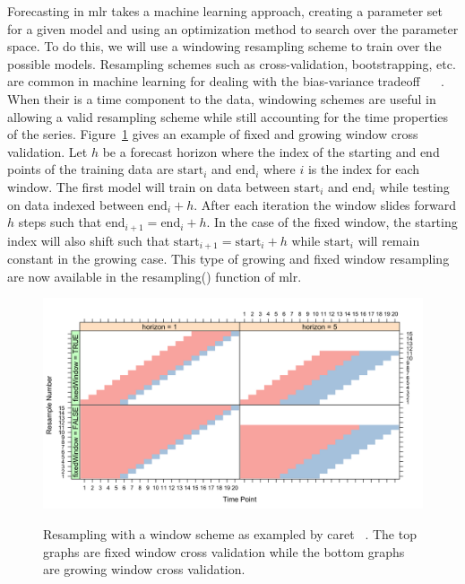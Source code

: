 \documentclass[12pt]{article}\usepackage[]{graphicx}\usepackage[]{color}
\makeatletter
\theoremstyle{definition}
\newcommand\code{\@codex}
\def\@codex#1{{\normalfont\ttfamily\hyphenchar\font=-1 #1}}
\newcommand{\pkg}[1]{{\fontseries{b}\selectfont #1}}
\makeatother
\begin{document}
Forecasting in \pkg{mlr} takes a machine learning approach, creating a parameter set for a given model and using an optimization method to search over the parameter space. To do this, we will use a windowing resampling scheme to train over the possible models. Resampling schemes such as cross-validation, bootstrapping, etc. are common in machine learning for dealing with the bias-variance tradeoff ~\cite{Friedman1997} ~\cite{rodriguezkfold}. When their is a time component to the data, windowing schemes are useful in allowing a valid resampling scheme while still accounting for the time properties of the series. Figure~\ref{fig:caret} gives an example of fixed and growing window cross validation. Let $h$ be a forecast horizon where the index of the starting and end points of the training data are $\text{start}_i$ and $\text{end}_i$ where $i$ is the index for each window. The first model will train on data between $\text{start}_i$ and $\text{end}_i$ while testing on data indexed between $\text{end}_i + h$. After each iteration the window slides forward $h$ steps such that $\text{end}_{i+1} = \text{end}_{i} + h$. In the case of the fixed window, the starting index will also shift such that $\text{start}_{i+1} = \text{start}_{i} + h$ while $\text{start}_i$ will remain constant in the growing case. This type of growing and fixed window resampling~\cite{hyndman2014forecasting} are now available in the \code{resampling()} function of \pkg{mlr}. 

\begin{figure}[ht]
\caption{Resampling with a window scheme as exampled by \pkg{caret} ~\cite{windowingcaret}. The top graphs are fixed window cross validation while the bottom graphs are growing window cross validation. }
  \includegraphics[scale = .23]{windowing_pic_caret}
  \centering
  \label{fig:caret}
\end{figure}
\newpage
\end{document}
